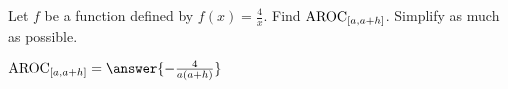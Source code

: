 \documentclass{ximera}
\author{Kenneth Berglund}
\begin{document}
\licenseSZ
\begin{exercise}
Let $f$ be a function defined by $f(x) = \frac{4}{x}$. Find $\mathrm{AROC}_{[a, a+h]}$.  Simplify as much as possible.

$\av_{[a, a+h]} = \answer{-\frac{4}{a(a+h)}}$

\end{exercise}
\end{document}
